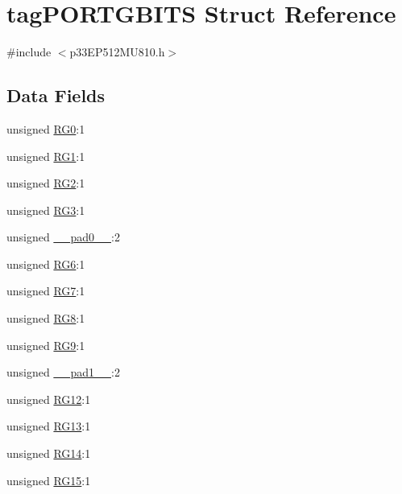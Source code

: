 \hypertarget{structtag_p_o_r_t_g_b_i_t_s}{}\section{tag\+P\+O\+R\+T\+G\+B\+I\+TS Struct Reference}
\label{structtag_p_o_r_t_g_b_i_t_s}


{\ttfamily \#include $<$p33\+E\+P512\+M\+U810.\+h$>$}

\subsection*{Data Fields}
\begin{DoxyCompactItemize}
\item 
unsigned \hyperlink{structtag_p_o_r_t_g_b_i_t_s_a323b8d6c4ce76a40cb306f80b898a710}{R\+G0}\+:1
\item 
unsigned \hyperlink{structtag_p_o_r_t_g_b_i_t_s_a598f03658f2c94ac784f62d691aacbfc}{R\+G1}\+:1
\item 
unsigned \hyperlink{structtag_p_o_r_t_g_b_i_t_s_aeda626d744316bfee5c1fcf01fcb836a}{R\+G2}\+:1
\item 
unsigned \hyperlink{structtag_p_o_r_t_g_b_i_t_s_a2cca3d172b07c0b9935717f8a5f39144}{R\+G3}\+:1
\item 
unsigned \hyperlink{structtag_p_o_r_t_g_b_i_t_s_adf71f3d8410c1f1dbbc96680a92c49af}{\+\_\+\+\_\+pad0\+\_\+\+\_\+}\+:2
\item 
unsigned \hyperlink{structtag_p_o_r_t_g_b_i_t_s_af7b05e91db6989ff7e70bd9ce93fee47}{R\+G6}\+:1
\item 
unsigned \hyperlink{structtag_p_o_r_t_g_b_i_t_s_a5bacdb385d511e5be1cf90f175de5211}{R\+G7}\+:1
\item 
unsigned \hyperlink{structtag_p_o_r_t_g_b_i_t_s_ac0d3344a4e1675e8cca8372a3cd30c6c}{R\+G8}\+:1
\item 
unsigned \hyperlink{structtag_p_o_r_t_g_b_i_t_s_a34e76848089aa8d55424e5586ba6f034}{R\+G9}\+:1
\item 
unsigned \hyperlink{structtag_p_o_r_t_g_b_i_t_s_acaf2d0924a107ec6e8d2e31febaf66f9}{\+\_\+\+\_\+pad1\+\_\+\+\_\+}\+:2
\item 
unsigned \hyperlink{structtag_p_o_r_t_g_b_i_t_s_a789728d2c66a5e42f26566b8ec56f6e3}{R\+G12}\+:1
\item 
unsigned \hyperlink{structtag_p_o_r_t_g_b_i_t_s_aa5d00119f57c8e91e4848703f8558719}{R\+G13}\+:1
\item 
unsigned \hyperlink{structtag_p_o_r_t_g_b_i_t_s_a150983b4b04392111ee4b3f8c12bf741}{R\+G14}\+:1
\item 
unsigned \hyperlink{structtag_p_o_r_t_g_b_i_t_s_a8c2debdf87443ad948e8d2a7d7b9e46b}{R\+G15}\+:1
\end{DoxyCompactItemize}


